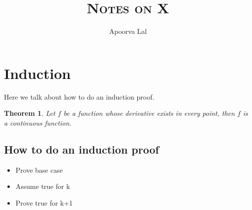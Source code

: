 \documentclass{article}
\newtheorem{thm}{Theorem}
\begin{document}
\title{\textsc{Notes on X}}
\author{Apoorva Lal}
\maketitle


\section{Induction}
\label{sec:induction}

Here we talk about how to do an induction proof.

\begin{thm}
Let $f$ be a function whose derivative exists in every point, then $f$
is a continuous function.
\end{thm}

\subsection{How to do an induction proof}

\begin{itemize}
  \item Prove base case
  \item Assume true for k
  \item Prove true for k+1
\end{itemize}
\end{document}
